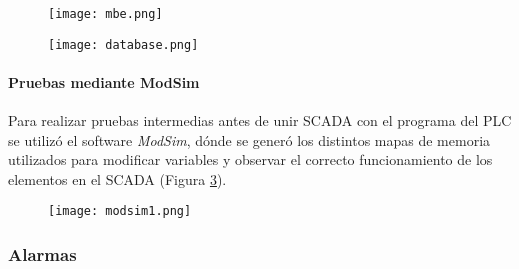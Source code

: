 \begin{figure}[h!]
	\centering
	\texttt{[image: mbe.png]}
	\label{fig:mbe}
\end{figure}
\begin{figure}[h!]
	\centering
	\texttt{[image: database.png]}
	\label{fig:database}
\end{figure}


\paragraph{Pruebas mediante ModSim}
Para realizar pruebas intermedias antes de unir SCADA con el programa del PLC se utilizó el software \textit{ModSim}, dónde se generó los distintos mapas de memoria utilizados para modificar variables y observar el correcto funcionamiento de los elementos en el SCADA (Figura \ref{fig:modsim1}).

\begin{figure}[h!]
	\centering
	\texttt{[image: modsim1.png]}
	\label{fig:modsim1}
\end{figure}



\subsubsection{Alarmas}

